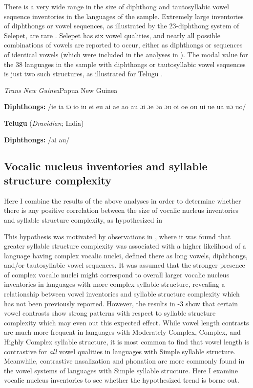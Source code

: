   There is a very wide range in the size of diphthong and tautosyllabic vowel sequence inventories in the languages of the sample. Extremely large inventories of diphthongs or vowel sequences, as illustrated by the 23-diphthong system of Selepet, are rare . Selepet has six vowel qualities, and nearly all possible combinations of vowels are reported to occur, either as diphthongs or sequences of identical vowels (which were included in the analyses in ). The modal value for the 38 languages in the sample with diphthongs or tautosyllabic vowel sequences is just two such structures, as illustrated for Telugu .

\ea\label{ex:(4.17)}
 \textit{Trans} \textit{New} \textit{Guinea}{Papua New Guinea}

\textbf{Diphthongs:} /ie ia iɔ io iu ei eu ai ae ao au ɔi ɔe ɔo ɔu oi oe ou ui ue ua uɔ uo/
\z

\ea\label{ex:(4.18)}
  \textbf{Telugu} (\textit{Dravidian}; India)

\textbf{Diphthongs:} /ai au/
\z

\subsection{Vocalic nucleus inventories and syllable structure complexity}\label{sec:4.3.5}

  Here I combine the results of the above analyses in order to determine whether there is any positive correlation between the size of vocalic nucleus inventories and syllable structure complexity, as hypothesized in 

  This hypothesis was motivated by observations in , where it was found that greater syllable structure complexity was associated with a higher likelihood of a language having complex vocalic nuclei, defined there as long vowels, diphthongs, and/or tautosyllabic vowel sequences. It was assumed that the stronger presence of complex vocalic nuclei might correspond to overall larger vocalic nucleus inventories in languages with more complex syllable structure, revealing a relationship between vowel inventories and syllable structure complexity which has not been previously reported. However, the results in -3 show that certain vowel contrasts show strong patterns with respect to syllable structure complexity which may even out this expected effect. While vowel length contrasts are much more frequent in languages with Moderately Complex, Complex, and Highly Complex syllable structure, it is most common to find that vowel length is contrastive for \textit{all} vowel qualities in languages with Simple syllable structure. Meanwhile, contrastive nasalization and phonation are more commonly found in the vowel systems of languages with Simple syllable structure. Here I examine vocalic nucleus inventories to see whether the hypothesized trend is borne out.

